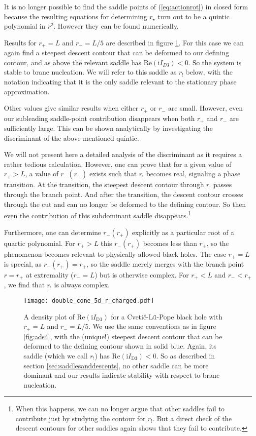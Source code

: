 \documentclass[11pt]{article}
\renewcommand{\i}{\mathrm{i}}
\begin{document}
It is no longer possible to find the saddle points of (\ref{eq:actionrot}) in closed form because the resulting equations for determining $r_{\star}$ turn out to be a quintic polynomial in $r^2$.  
However they can be found numerically.

Results for $r_+=L$ and $r_-=L/5$ are described in figure \ref{fig:subcharged}.  
For this case we can again find a steepest descent contour that can be deformed to our defining contour, and as above the relevant saddle has $\mathrm{Re}\left(\i I_{D3}\right) <0$.  
So the system is stable to brane nucleation.  
We will refer to this saddle as  $r_{!}$ below, with the notation indicating that it is the only saddle relevant to the stationary phase approximation.

Other values give similar results when either $r_+$ or $r_-$ are small.
However, even our subleading saddle-point contribution disappears when both $r_+$ and $r_-$ are sufficiently large.  
This can be shown analytically by investigating the discriminant of the above-mentioned quintic.

We will not present here a detailed analysis of the discriminant as it requires a rather tedious calculation. 
However, one can prove that for a given value of $r_+> L$, a value of $r_-(r_+)$ exists such that $r_!$ becomes real, signaling a phase transition. 
At the transition, the steepest descent contour through $r_!$ passes through the branch point.  
And after the transition, the descent contour crosses through the cut and can no longer be deformed to the defining contour.  
So then even the contribution of this subdominant saddle disappears.\footnote{
    When this happens, we can no longer argue that other saddles fail to contribute just by studying the contour for $r_!$.  But a direct check of the descent contours for other saddles again shows that they fail to contribute.
}


Furthermore, one can determine $r_-(r_+)$ explicitly as a particular root of a quartic polynomial. 
For $r_+ > L$ this $r_-(r_+)$ becomes less than $r_+$, so the phenomenon becomes relevant to physically allowed black holes.
The case $r_+=L$ is special, as $r_-(r_+) =r_+$, so the saddle merely merges with the branch point $r=r_+$ at extremality ($r_-=L$) but is otherwise complex. 
For $r_+<L$ and $r_-<r_+$, we find that $r_!$ is always complex.



\begin{figure}[htb]
    \centering
    \texttt{[image: double\_cone\_5d\_r\_charged.pdf]}
    \caption{A density plot of $\mathrm{Re}\left(\i I_{\mathrm{D}3}\right)$ for a Cveti\v{c}-L\"u-Pope black hole with $r_+=L$ and $r_-= L/5$.  We use the same conventions as in figure \ref{fig:ads4}, with the (unique!) steepest descent contour that can be deformed to the defining contour shown in solid blue. Again, its saddle (which we call $r_!$) has $\mathrm{Re}\left(\i I_{\mathrm{D}3}\right)<0$.  So as described in section \ref{sec:saddlesanddescents}, no other saddle can be more dominant and our results indicate stability with respect to brane nucleation.}
    \label{fig:subcharged}
\end{figure}
\end{document}
